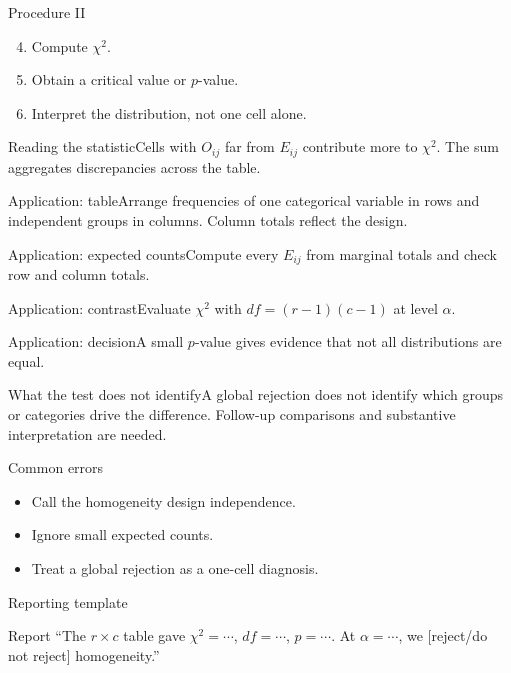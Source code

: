 \documentclass[10pt,aspectratio=169]{beamer}
\begin{document}
\begin{frame}{Procedure II}\small\begin{enumerate}\setcounter{enumi}{3}\item Compute $\chi^2$.\item Obtain a critical value or $p$-value.\item Interpret the distribution, not one cell alone.\end{enumerate}\end{frame}
\begin{frame}{Reading the statistic}\small Cells with $O_{ij}$ far from $E_{ij}$ contribute more to $\chi^2$. The sum aggregates discrepancies across the table.\end{frame}
\begin{frame}{Application: table}\small Arrange frequencies of one categorical variable in rows and independent groups in columns. Column totals reflect the design.\end{frame}
\begin{frame}{Application: expected counts}\small Compute every $E_{ij}$ from marginal totals and check row and column totals.\end{frame}
\begin{frame}{Application: contrast}\small Evaluate $\chi^2$ with $df=(r-1)(c-1)$ at level $\alpha$.\end{frame}
\begin{frame}{Application: decision}\small A small $p$-value gives evidence that not all distributions are equal.\end{frame}
\begin{frame}{What the test does not identify}\small A global rejection does not identify which groups or categories drive the difference. Follow-up comparisons and substantive interpretation are needed.\end{frame}
\begin{frame}{Common errors}\small\begin{itemize}\item Call the homogeneity design independence.\item Ignore small expected counts.\item Treat a global rejection as a one-cell diagnosis.\end{itemize}\end{frame}
\begin{frame}{Reporting template}\small\begin{block}{Report} ``The $r\times c$ table gave $\chi^2=\cdots$, $df=\cdots$, $p=\cdots$. At $\alpha=\cdots$, we [reject/do not reject] homogeneity.''\end{block}\end{frame}
\end{document}
